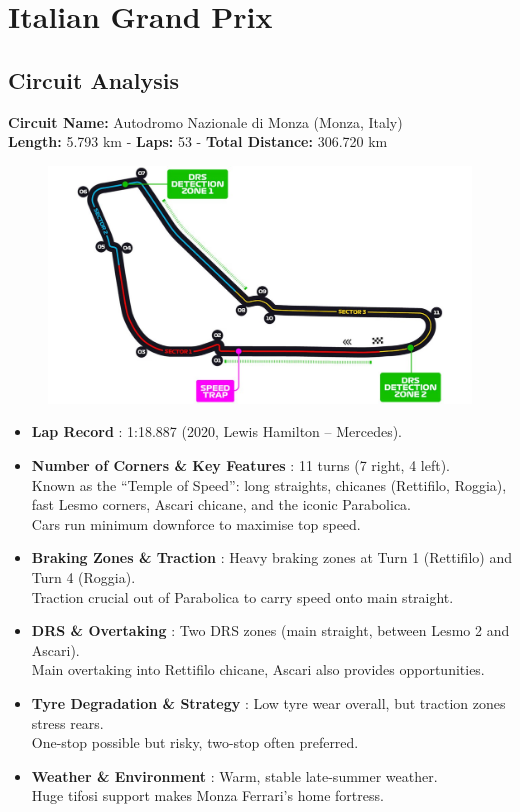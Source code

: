 \section{Italian Grand Prix}

\subsection{Circuit Analysis}

\textbf{Circuit Name:} Autodromo Nazionale di Monza (Monza, Italy) \\
\textbf{Length:} 5.793 km - \textbf{Laps:} 53 - \textbf{Total Distance:} 306.720 km

\begin{figure}[H]
    \centering
    \includegraphics[width=0.75\linewidth]{images/16.Italy_Circuit.jpg}
\end{figure}

\begin{itemize}
    \item \textbf{Lap Record} : 1:18.887 (2020, Lewis Hamilton – Mercedes).
    
    \item \textbf{Number of Corners \& Key Features} : 11 turns (7 right, 4 left). \\
    Known as the “Temple of Speed”: long straights, chicanes (Rettifilo, Roggia), fast Lesmo corners, Ascari chicane, and the iconic Parabolica. \\
    Cars run minimum downforce to maximise top speed.
    
    \item \textbf{Braking Zones \& Traction} : Heavy braking zones at Turn 1 (Rettifilo) and Turn 4 (Roggia). \\
    Traction crucial out of Parabolica to carry speed onto main straight.
    
    \item \textbf{DRS \& Overtaking} : Two DRS zones (main straight, between Lesmo 2 and Ascari). \\
    Main overtaking into Rettifilo chicane, Ascari also provides opportunities.
    
    \item \textbf{Tyre Degradation \& Strategy} : Low tyre wear overall, but traction zones stress rears. \\
    One-stop possible but risky, two-stop often preferred.
    
    \item \textbf{Weather \& Environment} : Warm, stable late-summer weather. \\
    Huge tifosi support makes Monza Ferrari’s home fortress.
\end{itemize}

